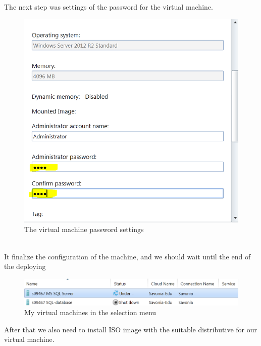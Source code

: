 \documentclass[english]{article}
\begin{document}
\newpage
The next step was settings of the password for the virtual machine.
\begin{figure}[hb]
\centerline{\includegraphics[scale=0.7]{SQL/passConf}}
\caption{The virtual machine password settings}
\end{figure}
\\
It finalize the configuration of the machine, and we should wait until the end of the deploying 
\begin{figure}[hb]
\centerline{\includegraphics[scale=0.7]{SQL/deploymentControlPanel}}
\caption{My virtual machines in the selection menu}
\end{figure}

\newpage
After that we also need to install ISO image with the suitable distributive for our virtual machine.
\end{document}

